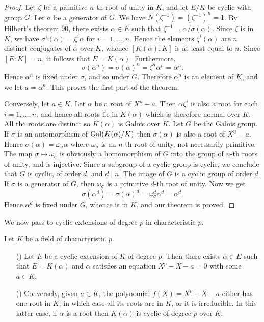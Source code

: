 \begin{proof}
Let $\zeta$ be a primitive $n$-th root of unity in $K$, and let $E/K$ be cyclic with group $G$. Let $\sigma$ be a generator of $G$. We have $N(\zeta^{-1})=(\zeta^{-1})^n=1$. By Hilbert's theorem $90$, there exists $\alpha\in E$ such that $\zeta^{-1}=\alpha/\sigma(\alpha)$. Since $\zeta$ is in $K$, we have $\sigma^i(\alpha)=\zeta^i\alpha$ for $i=1,\dots,n$. Hence the elements $\zeta^i(\alpha)$ are $n$ distinct conjugates of $\alpha$ over $K$, whence $[K(\alpha):K]$ is at least equal to $n$. Since $[E:K]=n$, it follows that $E=K(\alpha)$. Furthermore,
\[\sigma(\alpha^n)=\sigma(\alpha)^n=\zeta^n\alpha^n=\alpha^n.\]
Hence $\alpha^n$ is fixed under $\sigma$, and so under $G$. Therefore $\alpha^n$ is an element of $K$, and we let $a=\alpha^n$. This proves the
first part of the theorem.\par
Conversely, let $a\in K$. Let $\alpha$ be a root of $X^n-a$. Then $\alpha\zeta^i$ is also a root for each $i=1,\dots,n$, and hence all roots lie in $K(\alpha)$ which is therefore normal over $K$. All the roots are distinct so $K(\alpha)$ is Galois over $K$. Let $G$ be the Galois group. If $\sigma$ is an automorphism of $\mathrm{Gal}(K(\alpha)/K)$ then $\sigma(\alpha)$ is also a root of $X^n-a$. Hence $\sigma(\alpha)=\omega_\sigma\alpha$ where $\omega_\sigma$ is an $n$-th root of unity, not necessarily primitive. The map $\sigma\mapsto\omega_\sigma$ is obviously a homomorphism of $G$ into the group of $n$-th roots of unity, and is injective. Since a subgroup of a cyclic group is cyclic, we conclude that $G$ is cyclic, of order $d$, and $d\mid n$. The image of $G$ is a cyclic group of order $d$. If $\sigma$ is a generator of $G$, then $\omega_\sigma$ is a primitive $d$-th root of unity. Now we get
\[\sigma(\alpha^d)=\sigma(\alpha)^d=\omega_\sigma^d\alpha^d=\alpha^d.\]
Hence $\alpha^d$ is fixed under $G$, whence is in $K$, and our theorem is proved.
\end{proof}
We now pass to cyclic extensions of degree $p$ in characteristic $p$.
\begin{theorem}\label{field ext cyclic char p case}
Let $K$ be a field of characteristic $p$.
\begin{itemize}
\item[(\rmnum{1})] Let $E$ be a cyclic extension of $K$ of degree $p$. Then there exists $\alpha\in E$ such that $E=K(\alpha)$ and $\alpha$ satisfies an equation $X^p-X-a=0$ with some $a\in K$.
\item[(\rmnum{2})] Conversely, given $a\in K$, the polynomial $f(X)=X^p-X-a$ either has one root in $K$, in which case all its roots are in $K$, or it is irreducible. In this latter case, if $\alpha$ is a root then $K(\alpha)$ is cyclic of degree $p$ over $K$.
\end{itemize}
\end{theorem}
